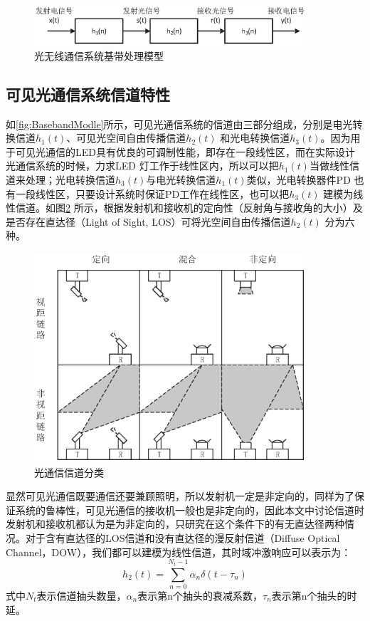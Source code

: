 \begin{figure}[htbp]
\centering
\includegraphics[width=0.9\textwidth]{figures/chapter-2/BasebandModle.eps}
\caption{光无线通信系统基带处理模型}
\label{fig:BasebandModle}
\end{figure}

\subsection{可见光通信系统信道特性}\label{subsection:Channel}
如\autoref{fig:BasebandModle}所示，可见光通信系统的信道由三部分组成，分别是电光转换信道$h_1(t)$、可见光空间自由传播信道$h_2(t)$ 和光电转换信道$h_3(t)$。因为用于可见光通信的LED具有优良的可调制性能，即存在一段线性区，而在实际设计光通信系统的时候，力求LED 灯工作于线性区内，所以可以把$h_1(t)$当做线性信道来处理；光电转换信道$h_3(t)$与电光转换信道$h_1(t)$类似，光电转换器件PD 也有一段线性区，只要设计系统时保证PD工作在线性区，也可以把$h_3(t)$ 建模为线性信道。如图\ref{fig:ChannelClass} 所示，根据发射机和接收机的定向性（反射角与接收角的大小）及是否存在直达径（Light of Sight, LOS）可将光空间自由传播信道$h_2(t)$ 分为六种。
\begin{figure}[htbp]
\centering
\includegraphics[width=0.9\textwidth]{figures/chapter-2/ChannelClass.eps}
\caption{光通信信道分类}
\label{fig:ChannelClass}
\end{figure}
显然可见光通信既要通信还要兼顾照明，所以发射机一定是非定向的，同样为了保证系统的鲁棒性，可见光通信的接收机一般也是非定向的，因此本文中讨论信道时发射机和接收机都认为是为非定向的，只研究在这个条件下的有无直达径两种情况。对于含有直达径的LOS信道和没有直达径的漫反射信道（Diffuse Optical Channel，DOW），我们都可以建模为线性信道，其时域冲激响应可以表示为：
\begin{equation}
\label{equ:opticalChannelMode}
h_2(t) = \sum_{n=0}^{N_t-1}\alpha_n \delta(t-\tau_n)
\end{equation}
式中$N_t$表示信道抽头数量，$\alpha_n$表示第n个抽头的衰减系数，$\tau_n$表示第n个抽头的时延。

